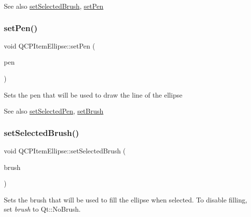 \begin{DoxySeeAlso}{See also}
\hyperlink{class_q_c_p_item_ellipse_a9693501cfaa43a099655c75bed0dab3f}{set\+Selected\+Brush}, \hyperlink{class_q_c_p_item_ellipse_adb81a663ed2420fcfa011e49f678d1a6}{set\+Pen} 
\end{DoxySeeAlso}
\mbox{\label{class_q_c_p_item_ellipse_adb81a663ed2420fcfa011e49f678d1a6}} 
\subsubsection{\texorpdfstring{set\+Pen()}{setPen()}}
{\footnotesize\ttfamily void Q\+C\+P\+Item\+Ellipse\+::set\+Pen (\begin{DoxyParamCaption}\item[{const Q\+Pen \&}]{pen }\end{DoxyParamCaption})}

Sets the pen that will be used to draw the line of the ellipse

\begin{DoxySeeAlso}{See also}
\hyperlink{class_q_c_p_item_ellipse_a6c542fba1dc918041c583f58a50dde99}{set\+Selected\+Pen}, \hyperlink{class_q_c_p_item_ellipse_a49fc74e6965834e873d027d026def798}{set\+Brush} 
\end{DoxySeeAlso}
\mbox{\label{class_q_c_p_item_ellipse_a9693501cfaa43a099655c75bed0dab3f}} 
\subsubsection{\texorpdfstring{set\+Selected\+Brush()}{setSelectedBrush()}}
{\footnotesize\ttfamily void Q\+C\+P\+Item\+Ellipse\+::set\+Selected\+Brush (\begin{DoxyParamCaption}\item[{const Q\+Brush \&}]{brush }\end{DoxyParamCaption})}

Sets the brush that will be used to fill the ellipse when selected. To disable filling, set {\itshape brush} to Qt\+::\+No\+Brush.

